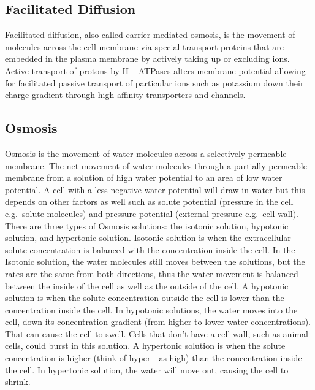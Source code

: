 \hypertarget{facilitated-diffusion}{%
\subsection{Facilitated Diffusion}\label{facilitated-diffusion}}

Facilitated diffusion, also called carrier-mediated osmosis, is the movement of molecules across the cell membrane via special transport proteins that are embedded in the plasma membrane by actively taking up or excluding ions. Active transport of protons by H+ ATPases alters membrane potential allowing for facilitated passive transport of particular ions such as potassium down their charge gradient through high affinity transporters and channels.

\hypertarget{osmosis}{%
\subsection{Osmosis}\label{osmosis}}

\href{https://en.wikipedia.org/wiki/Osmosis}{Osmosis} is the movement of water molecules across a selectively permeable membrane. The net movement of water molecules through a partially permeable membrane from a solution of high water potential to an area of low water potential. A cell with a less negative water potential will draw in water but this depends on other factors as well such as solute potential (pressure in the cell e.g.~solute molecules) and pressure potential (external pressure e.g.~cell wall). There are three types of Osmosis solutions: the isotonic solution, hypotonic solution, and hypertonic solution. Isotonic solution is when the extracellular solute concentration is balanced with the concentration inside the cell. In the Isotonic solution, the water molecules still moves between the solutions, but the rates are the same from both directions, thus the water movement is balanced between the inside of the cell as well as the outside of the cell. A hypotonic solution is when the solute concentration outside the cell is lower than the concentration inside the cell. In hypotonic solutions, the water moves into the cell, down its concentration gradient (from higher to lower water concentrations). That can cause the cell to swell. Cells that don't have a cell wall, such as animal cells, could burst in this solution. A hypertonic solution is when the solute concentration is higher (think of hyper - as high) than the concentration inside the cell. In hypertonic solution, the water will move out, causing the cell to shrink.



